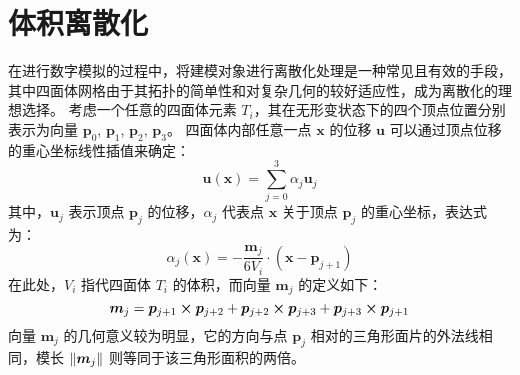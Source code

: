\section{体积离散化}
\label{sec:mtm:discretization}

在进行数字模拟的过程中，将建模对象进行离散化处理是一种常见且有效的手段，其中四面体网格由于其拓扑的简单性和对复杂几何的较好适应性，成为离散化的理想选择。
考虑一个任意的四面体元素 $T_i$，其在无形变状态下的四个顶点位置分别表示为向量 $\bm{p}_0$, $\bm{p}_1$, $\bm{p}_2$, $\bm{p}_3$。
四面体内部任意一点 $\bm{x}$ 的位移 $\bm{u}$ 可以通过顶点位移的重心坐标线性插值来确定：
\begin{equation}
  \bm{u}(\bm{x}) = \sum_{j = 0}^3 \alpha_j \bm{u}_j
\end{equation}
其中，$\bm{u}_j$ 表示顶点 $\bm{p}_j$ 的位移，$\alpha_j$ 代表点 $\bm{x}$ 关于顶点 $\bm{p}_j$ 的重心坐标，表达式为：
\begin{equation}
  \alpha_j(\bm{x}) = - \frac{\bm{m}_j}{6 V_i} \cdot (\bm{x} - \bm{p}_{j + 1})
\end{equation}
在此处，$V_i$ 指代四面体 $T_i$ 的体积，而向量 $\bm{m}_j$ 的定义如下：
\begin{equation}
  \bm{m}_j
  = \bm{p}_{j + 1} \cp \bm{p}_{j + 2} + \bm{p}_{j + 2} \cp \bm{p}_{j + 3} + \bm{p}_{j + 3} \cp \bm{p}_{j + 1}
\end{equation}
向量 $\bm{m}_j$ 的几何意义较为明显，它的方向与点 $\bm{p}_{j}$ 相对的三角形面片的外法线相同，模长 $\norm{\bm{m}_j}$ 则等同于该三角形面积的两倍。


